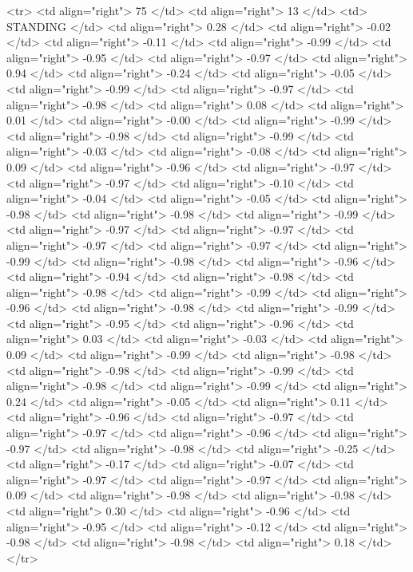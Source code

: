   <tr> <td align="right"> 75 </td> <td align="right">  13 </td> <td> STANDING </td> <td align="right"> 0.28 </td> <td align="right"> -0.02 </td> <td align="right"> -0.11 </td> <td align="right"> -0.99 </td> <td align="right"> -0.95 </td> <td align="right"> -0.97 </td> <td align="right"> 0.94 </td> <td align="right"> -0.24 </td> <td align="right"> -0.05 </td> <td align="right"> -0.99 </td> <td align="right"> -0.97 </td> <td align="right"> -0.98 </td> <td align="right"> 0.08 </td> <td align="right"> 0.01 </td> <td align="right"> -0.00 </td> <td align="right"> -0.99 </td> <td align="right"> -0.98 </td> <td align="right"> -0.99 </td> <td align="right"> -0.03 </td> <td align="right"> -0.08 </td> <td align="right"> 0.09 </td> <td align="right"> -0.96 </td> <td align="right"> -0.97 </td> <td align="right"> -0.97 </td> <td align="right"> -0.10 </td> <td align="right"> -0.04 </td> <td align="right"> -0.05 </td> <td align="right"> -0.98 </td> <td align="right"> -0.98 </td> <td align="right"> -0.99 </td> <td align="right"> -0.97 </td> <td align="right"> -0.97 </td> <td align="right"> -0.97 </td> <td align="right"> -0.97 </td> <td align="right"> -0.99 </td> <td align="right"> -0.98 </td> <td align="right"> -0.96 </td> <td align="right"> -0.94 </td> <td align="right"> -0.98 </td> <td align="right"> -0.98 </td> <td align="right"> -0.99 </td> <td align="right"> -0.96 </td> <td align="right"> -0.98 </td> <td align="right"> -0.99 </td> <td align="right"> -0.95 </td> <td align="right"> -0.96 </td> <td align="right"> 0.03 </td> <td align="right"> -0.03 </td> <td align="right"> 0.09 </td> <td align="right"> -0.99 </td> <td align="right"> -0.98 </td> <td align="right"> -0.98 </td> <td align="right"> -0.99 </td> <td align="right"> -0.98 </td> <td align="right"> -0.99 </td> <td align="right"> 0.24 </td> <td align="right"> -0.05 </td> <td align="right"> 0.11 </td> <td align="right"> -0.96 </td> <td align="right"> -0.97 </td> <td align="right"> -0.97 </td> <td align="right"> -0.96 </td> <td align="right"> -0.97 </td> <td align="right"> -0.98 </td> <td align="right"> -0.25 </td> <td align="right"> -0.17 </td> <td align="right"> -0.07 </td> <td align="right"> -0.97 </td> <td align="right"> -0.97 </td> <td align="right"> 0.09 </td> <td align="right"> -0.98 </td> <td align="right"> -0.98 </td> <td align="right"> 0.30 </td> <td align="right"> -0.96 </td> <td align="right"> -0.95 </td> <td align="right"> -0.12 </td> <td align="right"> -0.98 </td> <td align="right"> -0.98 </td> <td align="right"> 0.18 </td> </tr>
